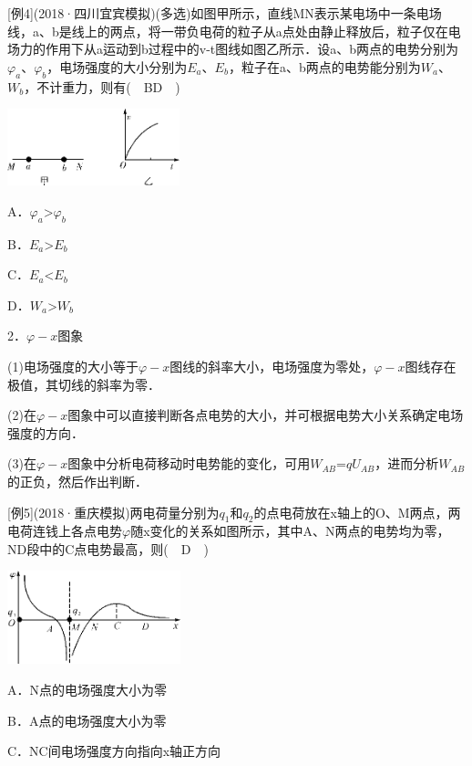 {[}例4{]}(2018·四川宜宾模拟)(多选)如图甲所示，直线MN表示某电场中一条电场线，a、b是线上的两点，将一带负电荷的粒子从a点处由静止释放后，粒子仅在电场力的作用下从a运动到b过程中的v-t图线如图乙所示．设a、b两点的电势分别为$\varphi_a$、$\varphi_b$，电场强度的大小分别为$E_a$、$E_b$，粒子在a、b两点的电势能分别为$W_a$、$W_b$，不计重力，则有(　BD　)

\begin{center}\includegraphics[width=1.96875in,height=0.875in]{media/image284.png}\end{center}

A．$\varphi_a$\textgreater $\varphi_b$　　 

B．$E_a$\textgreater $E_b$

C．$E_a$\textless $E_b$　　 

D．$W_a$\textgreater $W_b$

2．$\varphi -x$图象

(1)电场强度的大小等于$\varphi -x$图线的斜率大小，电场强度为零处，$\varphi -x$图线存在极值，其切线的斜率为零．

(2)在$\varphi -x$图象中可以直接判断各点电势的大小，并可根据电势大小关系确定电场强度的方向．

(3)在$\varphi -x$图象中分析电荷移动时电势能的变化，可用$W_{AB}$=$qU_{AB}$，进而分析$W_{AB}$的正负，然后作出判断．

{[}例5{]}(2018·重庆模拟)两电荷量分别为$q_1$和$q_2$的点电荷放在x轴上的O、M两点，两电荷连钱上各点电势$\varphi$随x变化的关系如图所示，其中A、N两点的电势均为零，ND段中的C点电势最高，则(　D　)

\begin{center}\includegraphics[width=1.97917in,height=1.0625in]{media/image285.png}\end{center}

A．N点的电场强度大小为零

B．A点的电场强度大小为零

C．NC间电场强度方向指向x轴正方向

